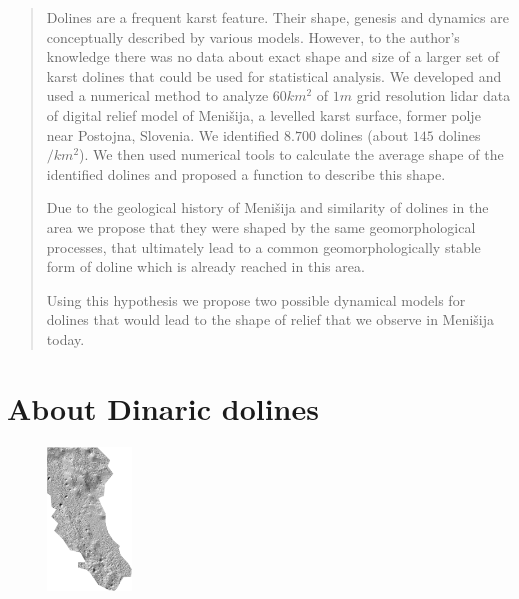 \documentclass[a0,portrait]{a0poster}
\begin{document}
\begin{multicols}{2} %



\begin{abstract}

Dolines are a frequent karst feature. Their shape, genesis and dynamics are conceptually described by various models. However, to the author’s knowledge there was no data about exact shape and size of a larger set of karst dolines that could be used for statistical analysis.
We developed and used a numerical method to analyze $60 km^2$ of $1 m$ grid resolution lidar data of digital relief model of Menišija, a levelled karst surface, former polje near Postojna, Slovenia. We identified $8.700$ dolines (about $145$ dolines$/ km^2$). We then used numerical tools to calculate the average shape of the identified dolines and proposed a function to describe this shape.

Due to the geological history of Menišija and similarity of dolines in the area we propose that they were shaped by the same geomorphological processes, that ultimately lead to a common geomorphologically stable form of doline which is already reached in this area. 

Using this hypothesis we propose two possible dynamical models for dolines that would lead to the shape of relief that we observe in Menišija today.

\end{abstract}



\section*{About Dinaric dolines}

\begin{figure}
\begin{center}
	\includegraphics[width=0.2\textwidth]{menisija-relief.png}
	\label{fig:menisija}
\end{center}
\end{figure}


\end{multicols}
\end{document}
